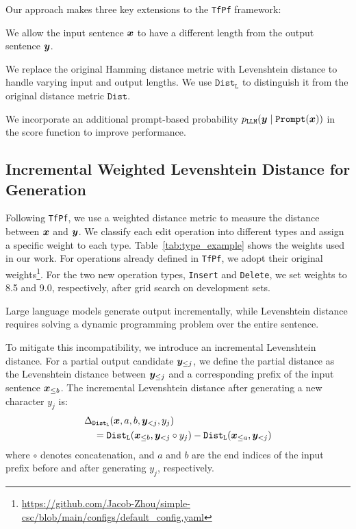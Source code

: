Our approach makes three key extensions to the \texttt{TfPf} framework:
\begin{inparaenum}[\itshape a)]
    \item We allow the input sentence ${\boldsymbol{x}}$ to have a different length from the output sentence ${\boldsymbol{y}}$.
    \item We replace the original Hamming distance metric with Levenshtein distance to handle varying input and output lengths. We use $\mathtt{Dist}_{\mathtt{L}}$ to distinguish it from the original distance metric $\mathtt{Dist}$.
    \item We incorporate an additional prompt-based probability $p_{\mathtt{LLM}}({\boldsymbol{y}}\mid \mathtt{Prompt}({\boldsymbol{x}}))$ in the score function to improve performance.
\end{inparaenum}

\subsection{Incremental Weighted Levenshtein Distance for Generation}
Following \texttt{TfPf}, we use a weighted distance metric to measure the distance between ${\boldsymbol{x}}$ and ${\boldsymbol{y}}$.
We classify each edit operation into different types and assign a specific weight to each type.
Table~\ref{tab:type_example} shows the weights used in our work.
For operations already defined in \texttt{TfPf}, we adopt their original weights\footnote{\url{https://github.com/Jacob-Zhou/simple-csc/blob/main/configs/default_config.yaml}}.
For the two new operation types, \texttt{Insert} and \texttt{Delete}, we set weights to 8.5 and 9.0, respectively, after grid search on development sets.

Large language models generate output incrementally, while Levenshtein distance requires solving a dynamic programming problem over the entire sentence.

To mitigate this incompatibility, we introduce an incremental Levenshtein distance.
For a partial output candidate ${\boldsymbol{y}}_{\le j}$, we define the partial distance as the Levenshtein distance between ${\boldsymbol{y}}_{\le j}$ and a corresponding prefix of the input sentence ${\boldsymbol{x}}_{\le b}$.
The incremental Levenshtein distance after generating a new character $y_j$ is:
\begin{equation}
    \begin{aligned}
         & \Delta_{\mathtt{Dist}_{\mathtt{L}}}({\boldsymbol{x}}, a, b, {\boldsymbol{y}}_{<j}, y_j)                                                                               \\
         & \quad = \mathtt{Dist}_{\mathtt{L}}({\boldsymbol{x}}_{\le b}, {\boldsymbol{y}}_{<j} \circ y_j) - \mathtt{Dist}_{\mathtt{L}}({\boldsymbol{x}}_{\le a}, {\boldsymbol{y}}_{<j})
    \end{aligned}
\end{equation}
where $\circ$ denotes concatenation, and $a$ and $b$ are the end indices of the input prefix before and after generating $y_j$, respectively.



